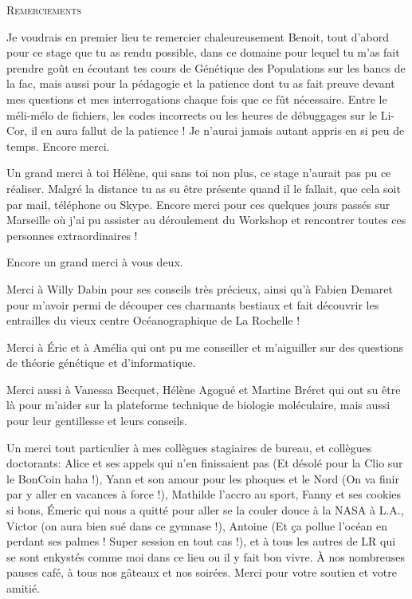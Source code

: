 \documentclass[a4paper,12pt,twoside]{article}\usepackage[]{graphicx}\usepackage[]{color}
\begin{document}
\begin{center}
 \textsc{\LARGE Remerciements}\\[2cm]
\end{center}

Je voudrais en premier lieu te remercier chaleureusement Benoit, tout d'abord pour ce stage que tu as rendu possible, dans ce domaine pour lequel tu m'as fait prendre goût en écoutant tes cours de Génétique des Populations sur les bancs de la fac, mais aussi pour la pédagogie et la patience dont tu as fait preuve devant mes questions et mes interrogations chaque fois que ce fût nécessaire. Entre le méli-mélo de fichiers, les codes incorrects ou les heures de débuggages sur le Li-Cor, il en aura fallut de la patience ! Je n'aurai jamais autant appris en si peu de temps. Encore merci.
 
Un grand merci à toi Hélène, qui sans toi non plus, ce stage n'aurait pas pu ce réaliser. Malgré la distance tu as su être présente quand il le fallait, que cela soit par mail, téléphone ou Skype. Encore merci pour ces quelques jours passés sur Marseille où j'ai pu assister au déroulement du Workshop et rencontrer toutes ces personnes extraordinaires !

Encore un grand merci à vous deux.

Merci à Willy Dabin pour ses conseils très précieux, ainsi qu'à Fabien Demaret pour m'avoir permi de découper ces charmants bestiaux et fait découvrir les entrailles du vieux centre Océanographique de La Rochelle !

Merci à Éric et à Amélia qui ont pu me conseiller et m'aiguiller sur des questions de théorie génétique et d'informatique.

Merci aussi à Vanessa Becquet, Hélène Agogué et Martine Bréret qui ont su être là pour m'aider sur la plateforme technique de biologie moléculaire, mais aussi pour leur gentillesse et leurs conseils.

Un merci tout particulier à mes collègues stagiaires de bureau, et collègues doctorants: Alice et ses appels qui n'en finissaient pas (Et désolé pour la Clio sur le BonCoin haha !), Yann et son amour pour les phoques et le Nord (On va finir par y aller en vacances à force !), Mathilde l'accro au sport, Fanny et ses cookies si bons, Émeric qui nous a quitté pour aller se la couler douce à la NASA à L.A., Victor (on aura bien sué dans ce gymnase !), Antoine (Et ça pollue l'océan en perdant ses palmes ! Super session en tout cas !), et à tous les autres de LR qui se sont enkystés comme moi dans ce lieu ou il y fait bon vivre. À nos nombreuses pauses café, à tous nos gâteaux et nos soirées. Merci pour votre soutien et votre amitié.
\end{document}
